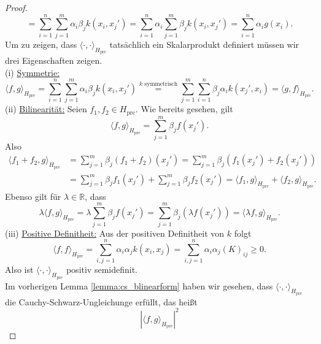 \documentclass{article}
\theoremstyle{plain}
\theoremstyle{definition}
\begin{document}
\begin{proof}
\[            = \sum_{i=1}^{n} \sum_{j=1}^{m} \alpha_{i} \beta_{j} k(x_{i},x_{j}')
            = \sum_{i=1}^{n} \alpha_{i} \sum_{j=1}^{m} \beta_{j} k(x_{i},x_{j}')
            = \sum_{i=1}^{n} \alpha_{i} g(x_{i}).
        \]
        Um zu zeigen, dass $\langle \cdot, \cdot \rangle_{H_{\text{pre}}}$ tatsächlich ein Skalarprodukt definiert müssen wir drei Eigenschaften zeigen. \\
        (i) \underline{Symmetrie:}
        \[
            \langle f, g \rangle_{H_{\text{pre}}} 
            = \sum_{i=1}^{n} \sum_{j=1}^{m} \alpha_{i} \beta_{j} k(x_{i},x_{j}')
            \overset{\text{$k$ symmetrisch}}{=} \sum_{j=1}^{m}  \sum_{i=1}^{n} \beta_{j} \alpha_{i} k(x_{j}',x_{i})
            = \langle g, f \rangle_{H_{\text{pre}}}.
        \]
        (ii) \underline{Bilinearität:}
        Seien $f_{1},f_{2} \in H_{\text{pre}}$. Wie bereits gesehen, gilt
        \[
            \langle f, g \rangle_{H_{\text{pre}}}
            = \sum_{j=1}^{m} \beta_{j} f(x_{j}').
        \]
        Also
        \[
        \begin{split}
            \langle f_{1} + f_{2}, g \rangle_{H_{\text{pre}}}
            & = \sum_{j=1}^{m} \beta_{j} (f_{1}+f_{2})(x_{j}')
            = \sum_{j=1}^{m} \beta_{j} (f_{1}(x_{j}')+f_{2}(x_{j}')) \\
            & = \sum_{j=1}^{m} \beta_{j} f_{1}(x_{j}') + \sum_{j=1}^{m} \beta_{j} f_{2}(x_{j}')
            = \langle f_{1}, g \rangle_{H_{\text{pre}}} + \langle f_{2}, g \rangle_{H_{\text{pre}}}.
        \end{split}
        \]
        Ebenso gilt für $\lambda \in \mathbb{R}$, dass
        \[
            \lambda \langle f, g \rangle_{H_{\text{pre}}}
            = \lambda \sum_{j=1}^{m} \beta_{j} f(x_{j}')
            = \sum_{j=1}^{m} \beta_{j} (\lambda f(x_{j}'))
            =  \langle \lambda f, g \rangle_{H_{\text{pre}}}.
        \]
        (iii) \underline{Positive Definitheit:}
        Aus der positiven Definitheit von $k$ folgt
        \[
            \langle f, f \rangle_{H_{\text{pre}}}
            = \sum_{i,j = 1}^{n} \alpha_{i} \alpha_{j} k(x_{i},x_{j})
            = \sum_{i,j = 1}^{n} \alpha_{i} \alpha_{j} (K)_{i j}
            \geq 0.
        \]
        Also ist $\langle \cdot, \cdot \rangle_{H_{\text{pre}}}$ positiv semidefinit. \\
        Im vorherigen Lemma \ref{lemma:cs_blinearform} haben wir gesehen, dass $\langle \cdot, \cdot \rangle_{H_{\text{pre}}}$ die Cauchy-Schwarz-Ungleichunge erfüllt, das heißt
        \[
            | \langle f, g \rangle_{H_{\text{pre}}} |^{2}
\]
\end{proof}
\end{document}
